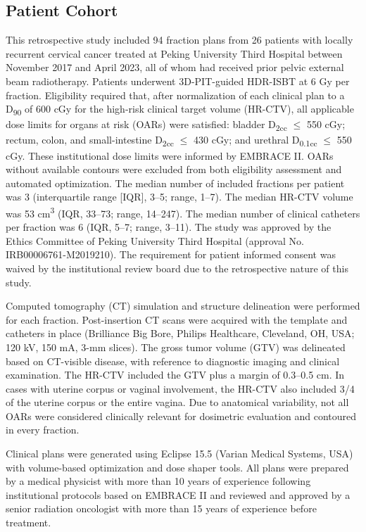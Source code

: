 \documentclass[12pt,twoside,letterpaper]{article}
\begin{document}
\subsection{Patient Cohort}\label{sec:2-1}

This retrospective study included 94 fraction plans from 26 patients with locally recurrent cervical cancer treated at Peking University Third Hospital between November 2017 and April 2023, all of whom had received prior pelvic external beam radiotherapy. Patients underwent 3D-PIT-guided HDR-ISBT at 6 Gy per fraction. Eligibility required that, after normalization of each clinical plan to a D\textsubscript{90} of 600 cGy for the high-risk clinical target volume (HR-CTV), all applicable dose limits for organs at risk (OARs) were satisfied: bladder D\textsubscript{2cc} \ensuremath{\leq} 550 cGy; rectum, colon, and small-intestine D\textsubscript{2cc} \ensuremath{\leq} 430 cGy; and urethral D\textsubscript{0.1cc} \ensuremath{\leq} 550 cGy. These institutional dose limits were informed by EMBRACE II.\cite{ref75} OARs without available contours were excluded from both eligibility assessment and automated optimization. The median number of included fractions per patient was 3 (interquartile range [IQR], 3--5; range, 1--7). The median HR-CTV volume was 53 cm\textsuperscript{3} (IQR, 33--73; range, 14--247). The median number of clinical catheters per fraction was 6 (IQR, 5--7; range, 3--11). The study was approved by the Ethics Committee of Peking University Third Hospital (approval No. IRB00006761-M2019210). The requirement for patient informed consent was waived by the institutional review board due to the retrospective nature of this study.

Computed tomography (CT) simulation and structure delineation were performed for each fraction. Post-insertion CT scans were acquired with the template and catheters in place (Brilliance Big Bore, Philips Healthcare, Cleveland, OH, USA; 120 kV, 150 mA, 3-mm slices). The gross tumor volume (GTV) was delineated based on CT-visible disease, with reference to diagnostic imaging and clinical examination. The HR-CTV included the GTV plus a margin of 0.3--0.5 cm. In cases with uterine corpus or vaginal involvement, the HR-CTV also included 3/4 of the uterine corpus or the entire vagina. Due to anatomical variability, not all OARs were considered clinically relevant for dosimetric evaluation and contoured in every fraction.

Clinical plans were generated using Eclipse 15.5 (Varian Medical Systems, USA) with volume-based optimization and dose shaper tools. All plans were prepared by a medical physicist with more than 10 years of experience following institutional protocols based on EMBRACE II\cite{ref75} and reviewed and approved by a senior radiation oncologist with more than 15 years of experience before treatment.
\end{document}
